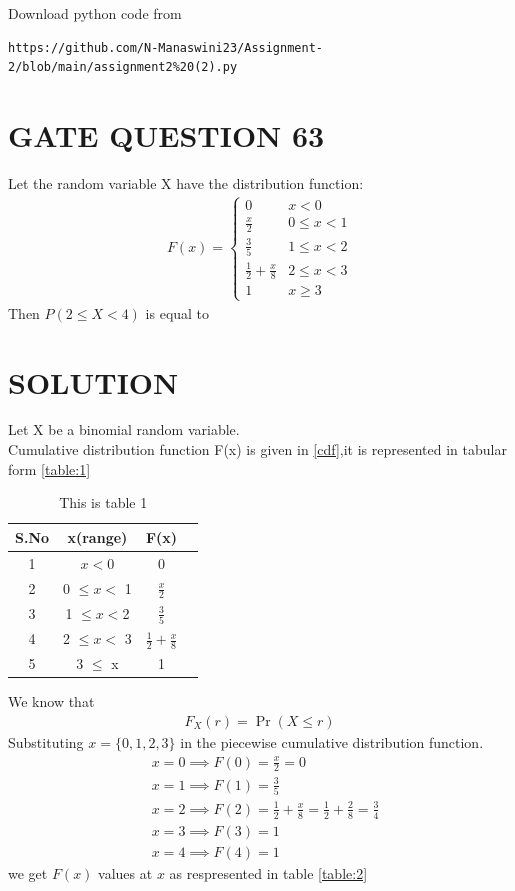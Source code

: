 \documentclass[journal,12pt,twocolumn]{IEEEtran}
\begin{document}
\renewcommand{\thefigure}{\theenumi}
\renewcommand{\thetable}{\theenumi}
Download python code from 
\begin{lstlisting}
https://github.com/N-Manaswini23/Assignment-2/blob/main/assignment2%20(2).py
\end{lstlisting}
%

\section*{GATE QUESTION 63}
Let the random variable X have the distribution function:
\begin{align}
F(x) = \begin{cases}
0 & x < 0
\\
\frac{x}{2} & 0 \leq x < 1 
\\
\frac{3}{5} & 1 \leq x < 2
\\
\frac{1}{2}+\frac{x}{8} & 2 \leq x < 3
\\
1 & x \geq 3
\end{cases} \label{cdf}
\end{align}
Then $P (2 \leq X < 4)$ is equal to


\section*{SOLUTION}
Let X be a binomial random variable. \\
Cumulative distribution function F(x) is given in \eqref{cdf},it is represented in tabular form \eqref{table:1}


\begin{table}[h!]
\resizebox{7cm}{!}
{ 
\begin{tabular}{|c|c|c|c|}
\hline
S.No & x(range) & F(x) \\
\hline
1 & $x < 0$ & 0 \\
\hline
2 & 0 $\leq x < $ 1 & $\frac{x}{2}$\\
\hline
3 & 1 $\leq  x < $2 & $\frac{3}{5}$\\
\hline
4 & 2 $\leq x  < $ 3 & $\frac{1}{2}+\frac{x}{8}$  \\
\hline
5 & 3 $\leq$ x & 1\\
\hline
\end{tabular} 
}
\caption{This is table 1}
\label{table:1}
\end{table}
We know that
\begin{align}
F_X(r) = \Pr (X \leq r) 
\end{align}
Substituting $x=\{0,1,2,3\}$ in the piecewise cumulative distribution function.\\
\begin{align}
&x=0 \implies F(0)=\frac{x}{2}=0\\
&x=1 \implies F(1)=\frac{3}{5}\\
&x=2 \implies F(2)=\frac{1}{2}+\frac{x}{8}=\frac{1}{2}+\frac{2}{8}=\frac{3}{4}\\
&x=3 \implies F(3)=1 \label{1} \\
&x=4 \implies F(4)=1 
\end{align}
we get $F(x)$ values at $x$ as respresented in table \eqref{table:2}
\end{document}
